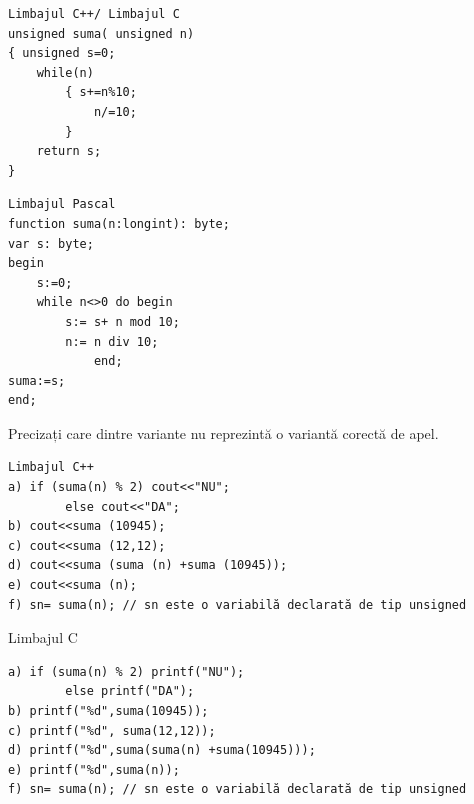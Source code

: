 \documentclass[10pt]{article}
\begin{document}
\begin{verbatim}
Limbajul C++/ Limbajul C
unsigned suma( unsigned n)
{ unsigned s=0;
    while(n)
        { s+=n%10;
            n/=10;
        }
    return s;
}
\end{verbatim}

\begin{verbatim}
Limbajul Pascal
function suma(n:longint): byte;
var s: byte;
begin
    s:=0;
    while n<>0 do begin
        s:= s+ n mod 10;
        n:= n div 10;
            end;
suma:=s;
end;
\end{verbatim}

Precizați care dintre variante nu reprezintă o variantă corectă de apel.

\begin{verbatim}
Limbajul C++
a) if (suma(n) % 2) cout<<"NU";
        else cout<<"DA";
b) cout<<suma (10945);
c) cout<<suma (12,12);
d) cout<<suma (suma (n) +suma (10945));
e) cout<<suma (n);
f) sn= suma(n); // sn este o variabilă declarată de tip unsigned
\end{verbatim}

Limbajul C

\begin{verbatim}
a) if (suma(n) % 2) printf("NU");
        else printf("DA");
b) printf("%d",suma(10945));
c) printf("%d", suma(12,12));
d) printf("%d",suma(suma(n) +suma(10945)));
e) printf("%d",suma(n));
f) sn= suma(n); // sn este o variabilă declarată de tip unsigned
\end{verbatim}
\end{document}
